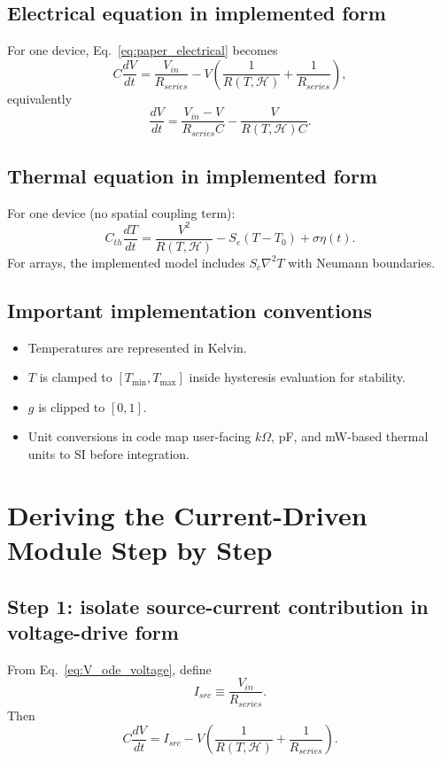 \documentclass[11pt]{article}
\begin{document}
\subsection{Electrical equation in implemented form}
For one device, Eq.~\eqref{eq:paper_electrical} becomes
\begin{equation}
C\frac{dV}{dt}=\frac{V_{in}}{R_{series}}-V\left(\frac{1}{R(T,\mathcal{H})}+\frac{1}{R_{series}}\right),
\label{eq:V_ode_voltage}
\end{equation}
equivalently
\begin{equation}
\frac{dV}{dt}=\frac{V_{in}-V}{R_{series}C}-\frac{V}{R(T,\mathcal{H})C}.
\end{equation}

\subsection{Thermal equation in implemented form}
For one device (no spatial coupling term):
\begin{equation}
C_{th}\frac{dT}{dt}=\frac{V^2}{R(T,\mathcal{H})}-S_e(T-T_0)+\sigma\eta(t).
\label{eq:T_ode_single}
\end{equation}
For arrays, the implemented model includes \(S_c\nabla^2T\) with Neumann boundaries.

\subsection{Important implementation conventions}
\begin{itemize}
    \item Temperatures are represented in Kelvin.
    \item \(T\) is clamped to \([T_{\min},T_{\max}]\) inside hysteresis evaluation for stability.
    \item \(g\) is clipped to \([0,1]\).
    \item Unit conversions in code map user-facing \(k\Omega\), pF, and mW-based thermal units to SI before integration.
\end{itemize}

\section{Deriving the Current-Driven Module Step by Step}

\subsection{Step 1: isolate source-current contribution in voltage-drive form}
From Eq.~\eqref{eq:V_ode_voltage}, define
\begin{equation}
I_{src}\equiv \frac{V_{in}}{R_{series}}.
\end{equation}
Then
\begin{equation}
C\frac{dV}{dt}=I_{src}-V\left(\frac{1}{R(T,\mathcal{H})}+\frac{1}{R_{series}}\right).
\label{eq:intermediate_current}
\end{equation}
\end{document}
